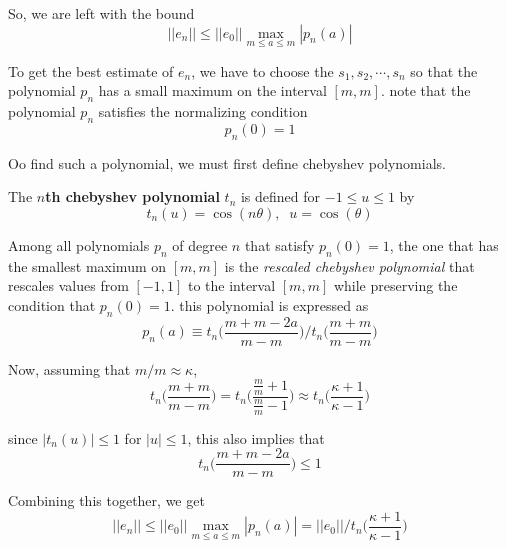   So, we are left with the bound
  \begin{equation}
    ||e_n|| \leq ||e_0|| \max_{m \leq a \leq m} |p_n (a)|
  \end{equation}

  To get the best estimate of $e_n$, we have to choose the $s_1, s_2, \cdots, s_n$ so that the polynomial $p_n$ has a small maximum on the interval $[m, m]$. note that the polynomial $p_n$ satisfies the normalizing condition 
  \begin{equation}
    p_n(0) = 1
  \end{equation}

  Oo find such a polynomial, we must first define chebyshev polynomials. 

  \begin{definition}
    The \textbf{$n$th chebyshev polynomial} $t_n$ is defined for $-1 \leq u \leq 1$ by
    \begin{equation}
      t_n (u) = \cos (n \theta), \;\; u = \cos(\theta)
    \end{equation}
  \end{definition}

  \begin{theorem}
    Among all polynomials $p_n$ of degree $n$ that satisfy $p_n (0) = 1$, the one that has the smallest maximum on $[m, m]$ is the \textit{rescaled chebyshev polynomial} that rescales values from $[-1, 1]$ to the interval $[m, m]$ while preserving the condition that $p_n (0) = 1$. this polynomial is expressed as
    \begin{equation}
      p_n (a) \equiv t_n \bigg( \frac{m+m-2a}{m-m} \bigg) \bigg/ t_n \bigg(\frac{m+m}{m-m} \bigg)
    \end{equation}
  \end{theorem} 

  Now, assuming that $m/m \approx \kappa$, 
  \begin{equation}
    t_n \bigg( \frac{m+m}{m-m} \bigg) = t_n \bigg(\frac{\frac{m}{m} + 1}{\frac{m}{m}-1} \bigg) \approx t_n \bigg(\frac{\kappa + 1}{\kappa - 1} \bigg)
  \end{equation}

  since $|t_n (u)| \leq 1$ for $|u| \leq 1$, this also implies that
  \begin{equation}
    t_n \bigg( \frac{m + m - 2a}{m-m} \bigg) \leq 1
  \end{equation}

  Combining this together, we get
  \begin{equation}
    ||e_n|| \leq ||e_0|| \max_{m \leq a \leq m} |p_n (a)| = ||e_0|| \bigg/ t_n \bigg( \frac{\kappa+1}{\kappa-1} \bigg)
  \end{equation}

